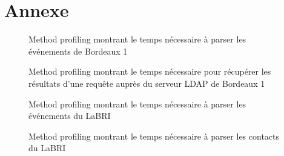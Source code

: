 \chapter{Annexe}

\begin{figure}[h!]
  \center
  \setlength\fboxsep{5pt}
  \setlength\fboxrule{0.5pt}
  \caption{Method profiling montrant le temps nécessaire à parser les événements de Bordeaux 1}
  \label{fig:method_prof1}
\end{figure}

\begin{figure}[h!]
  \center
  \setlength\fboxsep{5pt}
  \setlength\fboxrule{0.5pt}
  \caption{Method profiling montrant le temps nécessaire pour récupérer les résultats d'une requête auprès du serveur LDAP de Bordeaux 1}
  \label{fig:method_prof2}
\end{figure}

\begin{figure}[h!]
  \center
  \setlength\fboxsep{5pt}
  \setlength\fboxrule{0.5pt}
  \caption{Method profiling montrant le temps nécessaire à parser les événements du LaBRI}
  \label{fig:method_prof3}
\end{figure}

\begin{figure}[h!]
  \center
  \setlength\fboxsep{5pt}
  \setlength\fboxrule{0.5pt}
  \caption{Method profiling montrant le temps nécessaire à parser les contacts du LaBRI}
  \label{fig:method_prof4}
\end{figure}